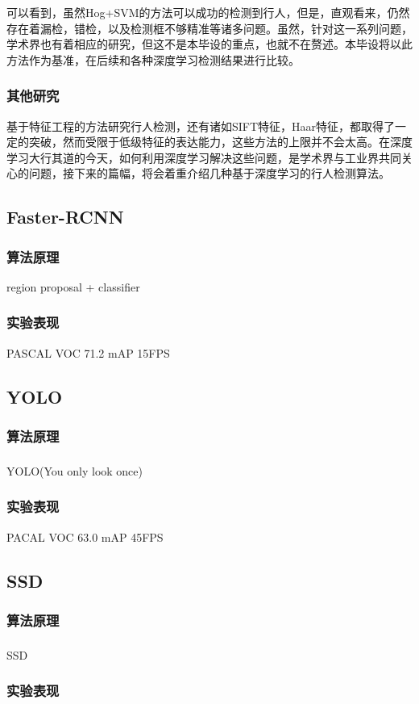 \documentclass[12pt,a4paper,titlepage]{article}
\newcommand{\upcite}[1]{\textsuperscript{\textsuperscript{\cite{#1}}}}  %
\begin{document}
可以看到，虽然Hog+SVM的方法可以成功的检测到行人，但是，直观看来，仍然存在着漏检，错检，以及检测框不够精准等诸多问题。虽然，针对这一系列问题，学术界也有着相应的研究，但这不是本毕设的重点，也就不在赘述。本毕设将以此方法作为基准，在后续和各种深度学习检测结果进行比较。


\subsubsection{其他研究}
基于特征工程的方法研究行人检测，还有诸如SIFT特征，Haar特征，都取得了一定的突破，然而受限于低级特征的表达能力，这些方法的上限并不会太高。在深度学习大行其道的今天，如何利用深度学习解决这些问题，是学术界与工业界共同关心的问题，接下来的篇幅，将会着重介绍几种基于深度学习的行人检测算法。

\subsection{Faster-RCNN}
\subsubsection{算法原理}
region proposal + classifier
\subsubsection{实验表现}
PASCAL VOC 71.2 mAP   15FPS
\subsection{YOLO}
\subsubsection{算法原理}
YOLO(You only look once)\upcite{redmon2016you}
\subsubsection{实验表现}
PACAL VOC 63.0 mAP    45FPS
\subsection{SSD}
\subsubsection{算法原理}
SSD\upcite{liu2016ssd}
\subsubsection{实验表现}
\end{document}
